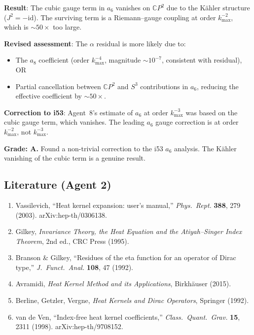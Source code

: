 \documentclass[11pt,a4paper]{article}
\newcommand{\CP}{\mathbb{C}P}
\begin{document}
\begin{tcolorbox}[colback=yellow!5!white, colframe=yellow!60!black, title={Agent 2: $a_6$ Suppression Assessment}]
\textbf{Result}: The cubic gauge term in $a_6$ vanishes on $\CP^2$ due to the K\"ahler structure ($J^2 = -\mathrm{id}$). The surviving term is a Riemann--gauge coupling at order $k_{\max}^{-2}$, which is $\sim 50\times$ too large.

\textbf{Revised assessment}: The $\alpha$ residual is more likely due to:
\begin{itemize}
\item The $a_8$ coefficient (order $k_{\max}^{-4}$, magnitude $\sim 10^{-7}$, consistent with residual), OR
\item Partial cancellation between $\CP^2$ and $S^3$ contributions in $a_6$, reducing the effective coefficient by $\sim 50\times$.
\end{itemize}

\textbf{Correction to i53}: Agent~8's estimate of $a_6$ at order $k_{\max}^{-3}$ was based on the cubic gauge term, which vanishes. The leading $a_6$ gauge correction is at order $k_{\max}^{-2}$, not $k_{\max}^{-3}$.

\textbf{Grade: A.} Found a non-trivial correction to the i53 $a_6$ analysis. The K\"ahler vanishing of the cubic term is a genuine result.
\end{tcolorbox}

\subsection{Literature (Agent 2)}

\begin{enumerate}
\item Vassilevich, ``Heat kernel expansion: user's manual,'' \textit{Phys.\ Rept.} \textbf{388}, 279 (2003). arXiv:hep-th/0306138.
\item Gilkey, \textit{Invariance Theory, the Heat Equation and the Atiyah--Singer Index Theorem}, 2nd ed., CRC Press (1995).
\item Branson \& Gilkey, ``Residues of the eta function for an operator of Dirac type,'' \textit{J.\ Funct.\ Anal.} \textbf{108}, 47 (1992).
\item Avramidi, \textit{Heat Kernel Method and its Applications}, Birkh\"auser (2015).
\item Berline, Getzler, Vergne, \textit{Heat Kernels and Dirac Operators}, Springer (1992).
\item van de Ven, ``Index-free heat kernel coefficients,'' \textit{Class.\ Quant.\ Grav.} \textbf{15}, 2311 (1998). arXiv:hep-th/9708152.
\end{enumerate}
\end{document}
